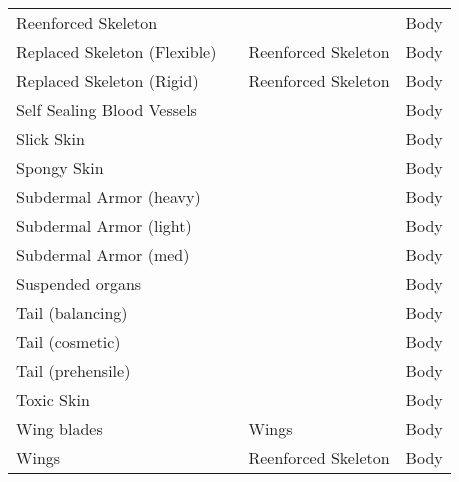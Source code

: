\documentclass[twoside]{book}
\begin{document}
\begin{longtable}{p{1.25in}p{2em}ll}
      \raggedright  Reenforced Skeleton&&& Body\tabularnewline
      \raggedright  Replaced Skeleton (Flexible)&& Reenforced Skeleton& Body\tabularnewline
      \raggedright  Replaced Skeleton (Rigid)&& Reenforced Skeleton& Body\tabularnewline
      \raggedright  Self Sealing Blood Vessels&&& Body\tabularnewline
      \raggedright  Slick Skin&&& Body\tabularnewline
      \raggedright  Spongy Skin&&& Body\tabularnewline
      \raggedright  Subdermal Armor (heavy)&&& Body\tabularnewline
      \raggedright  Subdermal Armor (light)&&& Body\tabularnewline
      \raggedright  Subdermal Armor (med)&&& Body\tabularnewline
      \raggedright  Suspended organs&&& Body\tabularnewline
      \raggedright  Tail (balancing)&&& Body\tabularnewline
      \raggedright  Tail (cosmetic)&&& Body\tabularnewline
      \raggedright  Tail (prehensile)&&& Body\tabularnewline
      \raggedright  Toxic Skin&&& Body\tabularnewline
      \raggedright  Wing blades&& Wings& Body\tabularnewline
      \raggedright  Wings&& Reenforced Skeleton& Body\tabularnewline
      
\end{longtable}
    
\end{document}
